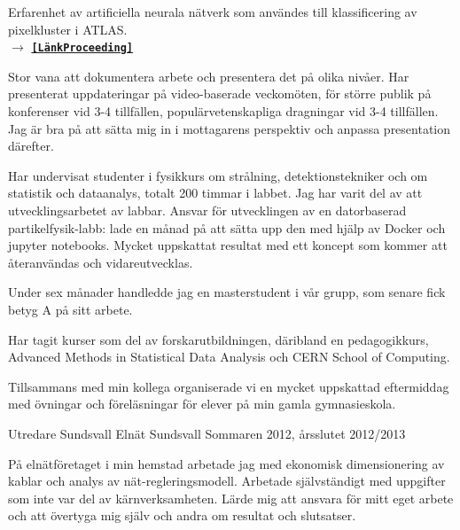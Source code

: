 \begin{cventries}
{\begin{cvitems}
\item {Erfarenhet av artificiella neurala n{\"a}tverk som anv{\"a}ndes till klassificering av pixelkluster i ATLAS. \\
$\rightarrow$  \href{https://pos.sissa.it/276/213/pdf}{{\bf \texttt{[L{\"a}nkProceeding]}}}}
\item Stor vana att dokumentera arbete och presentera det p{\aa} olika niv{\aa}er. 
		Har presenterat uppdateringar p{\aa} video-baserade veckom{\"o}ten, f{\"o}r st{\"o}rre publik p{\aa} konferenser vid 3-4 tillf{\"a}llen, popul{\"a}rvetenskapliga dragningar vid 3-4 tillf{\"a}llen.
		Jag {\"a}r bra p{\aa} att s{\"a}tta mig in i mottagarens perspektiv och anpassa presentation d{\"a}refter.
\item Har undervisat studenter i fysikkurs om str{\aa}lning,  detektionstekniker och om statistik och dataanalys, totalt 200 timmar i labbet. Jag har varit del av att utvecklingsarbetet av labbar. Ansvar f{\"o}r utvecklingen av en datorbaserad partikelfysik-labb: lade en m{\aa}nad p{\aa} att s{\"a}tta upp den med hj{\"a}lp av Docker och jupyter notebooks. Mycket uppskattat resultat med ett koncept som kommer att {\aa}teranv{\"a}ndas och vidareutvecklas.
\item Under sex m{\aa}nader handledde jag en masterstudent i v{\aa}r grupp, som senare fick betyg A p{\aa} sitt arbete.
\item Har tagit kurser som del av forskarutbildningen, däribland en pedagogikkurs, Advanced Methods in Statistical Data Analysis och CERN School of Computing.
\item Tillsammans med min kollega organiserade vi en mycket uppskattad eftermiddag med {\"o}vningar och f{\"o}rel{\"a}sningar f{\"or} elever p{\aa} min gamla gymnasieskola.
\end{cvitems}
}



\cventry
{Utredare} %
{Sundsvall Eln\"{a}t} %
{Sundsvall} %
{Sommaren 2012, {\aa}rsslutet 2012/2013} %
{ %
\begin{cvitems}
\item {P{\aa} eln{\"a}tf{\"o}retaget i min hemstad arbetade jag med ekonomisk dimensionering av kablar och analys av n{\"a}t-regleringsmodell.
		Arbetade sj{\"a}lvst{\"a}ndigt med uppgifter som inte var del av k{\"a}rnverksamheten.
		L{\"a}rde mig att ansvara f{\"o}r mitt eget arbete och att {\"o}vertyga mig sj{\"a}lv och andra om resultat och slutsatser.}
\end{cvitems}
}


\end{cventries}
